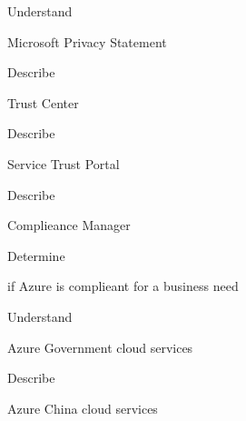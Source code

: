 \documentclass{scrartcl}
\newenvironment{flashcard}[2][]{%
    #1
    \vfill
    \centerline{\Large{#2}}
    \vfill
    \newpage
}
{\newpage}
\begin{document}
    \begin{flashcard}[Understand]{Microsoft Privacy Statement}

    \end{flashcard}

    \begin{flashcard}[Describe]{Trust Center}

    \end{flashcard}

    \begin{flashcard}[Describe]{Service Trust Portal}

    \end{flashcard}

    \begin{flashcard}[Describe]{Complieance Manager}

    \end{flashcard}

    \begin{flashcard}[Determine]{if Azure is complieant for a business need}

    \end{flashcard}

    \begin{flashcard}[Understand]{Azure Government cloud services}

    \end{flashcard}

    \begin{flashcard}[Describe]{Azure China cloud services}

    \end{flashcard}
\end{document}
